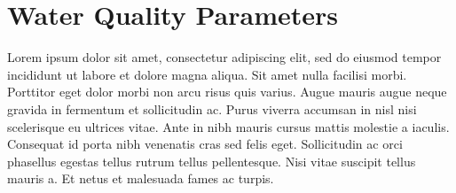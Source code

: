 
\chapter{Water Quality Parameters}



Lorem ipsum dolor sit amet, consectetur adipiscing elit, sed do eiusmod tempor incididunt ut labore et dolore magna aliqua. Sit amet nulla facilisi morbi. Porttitor eget dolor morbi non arcu risus quis varius. Augue mauris augue neque gravida in fermentum et sollicitudin ac. Purus viverra accumsan in nisl nisi scelerisque eu ultrices vitae. Ante in nibh mauris cursus mattis molestie a iaculis. Consequat id porta nibh venenatis cras sed felis eget. Sollicitudin ac orci phasellus egestas tellus rutrum tellus pellentesque. Nisi vitae suscipit tellus mauris a. Et netus et malesuada fames ac turpis.